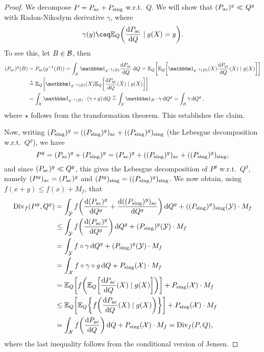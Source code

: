 \begin{example}
\begin{proof}
	We decompose $P = P_\mathrm{ac} + P_\mathrm{sing}$ w.r.t.\ $Q$. We will show that $(P_\mathrm{ac})^g \ll Q^g$ with Radon-Nikodym derivative $\gamma$, where
	\[
	\gamma(y) \ceq \EE_Q \qty( \dv{P\ac}{Q}(X) \mid g(X) = y). 
	\]
	To see this, let $B \in \mathcal B$, then
	\begin{align*}
		(P\ac)^g(B) &= P\ac(g^{-1}(B)) = \int_\XX \ind_{g^{-1}(B)} \dv{P\ac}{Q} \dd{Q} = \EE_Q\qty[ \EE_Q \qty[ \ind_{g^{-1}(B)}(X) \dv{P\ac}{Q}\qty(X) \mid g(X)]] \\
		&\overset\star= \EE_Q \qty[ \ind_{g^{-1}(B)}(X) \EE_Q\qty[\dv{P\ac}{Q}\qty(X) \mid g(X)]] \\
		&= \int_\XX \ind_{g^{-1}(B)} \cdot (\gamma \circ g) \dd{Q} 
		\overset\star= \int_\YY \ind_B \cdot \gamma \dd{Q^g} = \int_B \gamma \dd{Q^g}, 
	\end{align*}
where $\star$ follows from the transformation theorem. This establishes the claim. 

Now, writing $(P_\mathrm{sing})^g = ((P_\mathrm{sing})^g)_\mathrm{ac} + ((P_\mathrm{sing})^g)_\mathrm{sing}$ (the Lebesgue decomposition w.r.t.\ $Q^g$), we have
\[
P^g = (P_\mathrm{ac})^g + (P_\mathrm{sing})^g = (P_\mathrm{ac})^g + ((P_\mathrm{sing})^g)_\mathrm{ac} + ((P_\mathrm{sing})^g)_\mathrm{sing}, 
\]
and since $(P_\mathrm{ac})^g \ll Q^g$, this gives the Lebesgue decomposition of $P^g$ w.r.t.\ $Q^g$, namely $(P^g)_\mathrm{ac} = (P_\mathrm{ac})^g$ and $(P^g)_\mathrm{sing} = ((P_\mathrm{sing})^g)_\mathrm{sing}$. We now obtain, using $f(x+y) \leq f(x) + M_f$, that
\begin{align*}
	\operatorname{Div}_f(P^g, Q^g) &= \int_\mathcal Y f\qty(\dv{(P_\mathrm{ac})^g}{Q^g} + \dv{((P_\mathrm{sing})^g)_\mathrm{ac}}{Q^g}) \dd{Q^g} + ((P_\mathrm{sing})^g)_\mathrm{sing}(\mathcal Y) \cdot M_f \\
	&\leq \int_\mathcal Y f\qty(\dv{(P_\mathrm{ac})^g}{Q^g}) \dd{Q^g} + (P_\mathrm{sing})^g(\mathcal Y) \cdot M_f \\
	&= \int_\mathcal Y f \circ \gamma \dd{Q^g} + (P_\mathrm{sing})^g(\mathcal Y) \cdot M_f \\
	&= \int_\mathcal X f\circ\gamma\circ g \dd{Q} + P_\mathrm{sing}(\mathcal X) \cdot M_f \\
	&= \mathbb E_Q\qty[ f\qty(\mathbb E_Q\qty[ \dv{P_\mathrm{ac}}{Q}\qty(X) \mid g(X)])] + P_\mathrm{sing}(\mathcal X) \cdot M_f \\
	&\leq \mathbb E_Q \qty[ \mathbb E_Q \qty{ f\qty(\dv{P_\mathrm{ac}}{Q} \qty(X) \mid g(X))}] + P_\mathrm{sing}(\mathcal X) \cdot M_f \\
	&= \int_\mathcal X f\qty(\dv{P_\mathrm{ac}}{Q}) \dd{Q} + P_\mathrm{sing}(\mathcal X) \cdot M_f = \operatorname{Div}_f(P, Q), 
\end{align*}
where the last inequality follows from the conditional version of Jensen. 
\end{proof}
\end{example}